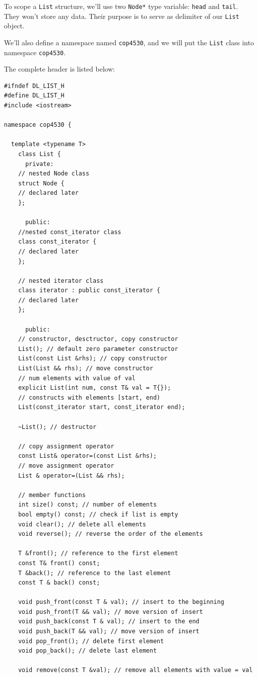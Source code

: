 \documentclass[12pt]{book}
\begin{document}
To scope a \texttt{List} structure, we'll use two \texttt{Node*} type variable: \texttt{head} and \texttt{tail}. They won't store any data. Their purpose is to serve as delimiter of our \texttt{List} object.

We'll also define a namespace named \texttt{cop4530}, and we will put the \texttt{List} class into namespace \texttt{cop4530}.

The complete header is listed below:
\begin{verbatim}
#ifndef DL_LIST_H
#define DL_LIST_H
#include <iostream>

namespace cop4530 {

  template <typename T>
    class List {
      private:
	// nested Node class
	struct Node {
	// declared later
	};

      public:
	//nested const_iterator class
	class const_iterator {
	// declared later
	};

	// nested iterator class
	class iterator : public const_iterator {
	// declared later
	};

      public:
	// constructor, desctructor, copy constructor
	List(); // default zero parameter constructor
	List(const List &rhs); // copy constructor
	List(List && rhs); // move constructor
	// num elements with value of val
	explicit List(int num, const T& val = T{}); 
	// constructs with elements [start, end)
	List(const_iterator start, const_iterator end); 

	~List(); // destructor

	// copy assignment operator
	const List& operator=(const List &rhs);
	// move assignment operator
	List & operator=(List && rhs);

	// member functions
	int size() const; // number of elements
	bool empty() const; // check if list is empty
	void clear(); // delete all elements
	void reverse(); // reverse the order of the elements

	T &front(); // reference to the first element
	const T& front() const;
	T &back(); // reference to the last element
	const T & back() const; 

	void push_front(const T & val); // insert to the beginning
	void push_front(T && val); // move version of insert
	void push_back(const T & val); // insert to the end
	void push_back(T && val); // move version of insert
	void pop_front(); // delete first element
	void pop_back(); // delete last element

	void remove(const T &val); // remove all elements with value = val


\end{verbatim}
\end{document}

